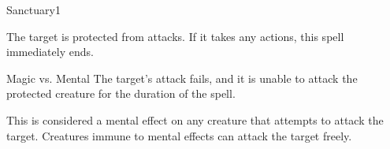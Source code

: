 \begin{spellsection}{Sanctuary}{1}
    \begin{spellheader}
    \end{spellheader}
    \begin{spellcontent}
        \begin{spelltargetinginfo}
        \end{spelltargetinginfo}
        \begin{spelleffects}
            \spelleffect The target is protected from attacks. If it takes any actions, this spell immediately ends.
            \spelldur \durshort
        \end{spelleffects}
    \end{spellcontent}
    \begin{spellsubcontent}
        \begin{spelltargetinginfo}
        \end{spelltargetinginfo}
        \begin{spelleffects}
            \begin{spellattack}{Magic vs. Mental}
                \spellsuccess The target's attack fails, and it is unable to attack the protected creature for the duration of the spell.
            \end{spellattack}
        \end{spelleffects}
    \end{spellsubcontent}
    \begin{spellfooter}
        \spellnotes This is considered a mental effect on any creature that attempts to attack the target. Creatures immune to mental effects can attack the target freely.
        \miscastexplode
    \end{spellfooter}
\end{spellsection}

